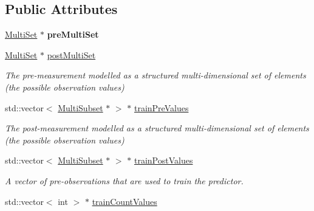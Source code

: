 \subsection*{Public Attributes}
\begin{DoxyCompactItemize}
\item 
\hypertarget{classPredictionDataset_a47b4d8ccf188271ce59ee481377a3c5f}{\hyperlink{classMultiSet}{Multi\-Set} $\ast$ {\bfseries pre\-Multi\-Set}}\label{classPredictionDataset_a47b4d8ccf188271ce59ee481377a3c5f}

\item 
\hypertarget{classPredictionDataset_a22343b4582412434376af66cb42d2d50}{\hyperlink{classMultiSet}{Multi\-Set} $\ast$ \hyperlink{classPredictionDataset_a22343b4582412434376af66cb42d2d50}{post\-Multi\-Set}}\label{classPredictionDataset_a22343b4582412434376af66cb42d2d50}

\begin{DoxyCompactList}\small\item\em The pre-\/measurement modelled as a structured multi-\/dimensional set of elements (the possible observation values) \end{DoxyCompactList}\item 
\hypertarget{classPredictionDataset_af09491db0c4267fa086bf640c4740483}{std\-::vector$<$ \hyperlink{classMultiSubset}{Multi\-Subset} $\ast$ $>$ $\ast$ \hyperlink{classPredictionDataset_af09491db0c4267fa086bf640c4740483}{train\-Pre\-Values}}\label{classPredictionDataset_af09491db0c4267fa086bf640c4740483}

\begin{DoxyCompactList}\small\item\em The post-\/measurement modelled as a structured multi-\/dimensional set of elements (the possible observation values) \end{DoxyCompactList}\item 
\hypertarget{classPredictionDataset_a30e9419638339a7497f3d234780b2c20}{std\-::vector$<$ \hyperlink{classMultiSubset}{Multi\-Subset} $\ast$ $>$ $\ast$ \hyperlink{classPredictionDataset_a30e9419638339a7497f3d234780b2c20}{train\-Post\-Values}}\label{classPredictionDataset_a30e9419638339a7497f3d234780b2c20}

\begin{DoxyCompactList}\small\item\em A vector of pre-\/observations that are used to train the predictor. \end{DoxyCompactList}\item 
\hypertarget{classPredictionDataset_af4fdcf7cfd236a99a73f18d630199291}{std\-::vector$<$ int $>$ $\ast$ \hyperlink{classPredictionDataset_af4fdcf7cfd236a99a73f18d630199291}{train\-Count\-Values}}\label{classPredictionDataset_af4fdcf7cfd236a99a73f18d630199291}


\end{DoxyCompactItemize}
